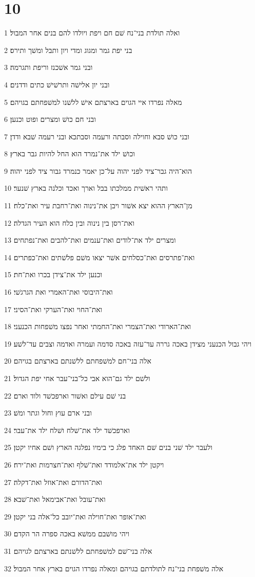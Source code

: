 \chapter{10}

\par 1 ואלה תולדת בני־נח שׁם חם ויפת ויולדו להם בנים אחר המבול׃
\par 2 בני יפת גמר ומגוג ומדי ויון ותבל ומשׁך ותירס׃
\par 3 ובני גמר אשׁכנז וריפת ותגרמה׃
\par 4 ובני יון אלישׁה ותרשׁישׁ כתים ודדנים׃
\par 5 מאלה נפרדו איי הגוים בארצתם אישׁ ללשׁנו למשׁפחתם בגויהם׃
\par 6 ובני חם כושׁ ומצרים ופוט וכנען׃
\par 7 ובני כושׁ סבא וחוילה וסבתה ורעמה וסבתכא ובני רעמה שׁבא ודדן׃
\par 8 וכושׁ ילד את־נמרד הוא החל להיות גבר בארץ׃
\par 9 הוא־היה גבר־ציד לפני יהוה על־כן יאמר כנמרד גבור ציד לפני יהוה׃
\par 10 ותהי ראשׁית ממלכתו בבל וארך ואכד וכלנה בארץ שׁנער׃
\par 11 מן־הארץ ההוא יצא אשׁור ויבן את־נינוה ואת־רחבת עיר ואת־כלח׃
\par 12 ואת־רסן בין נינוה ובין כלח הוא העיר הגדלה׃
\par 13 ומצרים ילד את־לודים ואת־ענמים ואת־להבים ואת־נפתחים׃
\par 14 ואת־פתרסים ואת־כסלחים אשׁר יצאו משׁם פלשׁתים ואת־כפתרים׃
\par 15 וכנען ילד את־צידן בכרו ואת־חת׃
\par 16 ואת־היבוסי ואת־האמרי ואת הגרגשׁי׃
\par 17 ואת־החוי ואת־הערקי ואת־הסיני׃
\par 18 ואת־הארודי ואת־הצמרי ואת־החמתי ואחר נפצו משׁפחות הכנעני׃
\par 19 ויהי גבול הכנעני מצידן באכה גררה עד־עזה באכה סדמה ועמרה ואדמה וצבים עד־לשׁע׃
\par 20 אלה בני־חם למשׁפחתם ללשׁנתם בארצתם בגויהם׃
\par 21 ולשׁם ילד גם־הוא אבי כל־בני־עבר אחי יפת הגדול׃
\par 22 בני שׁם עילם ואשׁור וארפכשׁד ולוד וארם׃
\par 23 ובני ארם עוץ וחול וגתר ומשׁ׃
\par 24 וארפכשׁד ילד את־שׁלח ושׁלח ילד את־עבר׃
\par 25 ולעבר ילד שׁני בנים שׁם האחד פלג כי בימיו נפלגה הארץ ושׁם אחיו יקטן׃
\par 26 ויקטן ילד את־אלמודד ואת־שׁלף ואת־חצרמות ואת־ירח׃
\par 27 ואת־הדורם ואת־אוזל ואת־דקלה׃
\par 28 ואת־עובל ואת־אבימאל ואת־שׁבא׃
\par 29 ואת־אופר ואת־חוילה ואת־יובב כל־אלה בני יקטן׃
\par 30 ויהי מושׁבם ממשׁא באכה ספרה הר הקדם׃
\par 31 אלה בני־שׁם למשׁפחתם ללשׁנתם בארצתם לגויהם׃
\par 32 אלה משׁפחת בני־נח לתולדתם בגויהם ומאלה נפרדו הגוים בארץ אחר המבול׃

